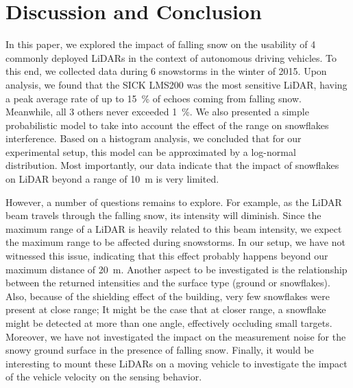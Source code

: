 \section{Discussion and Conclusion}
\label{sec:chap_lidar_conclu}

In this paper, we explored the impact of falling snow on the usability of 4 commonly deployed LiDARs in the context of autonomous driving vehicles. To this end, we collected data during 6 snowstorms in the winter of 2015. Upon analysis, we found that the SICK LMS200 was the most sensitive LiDAR, having a peak average rate of up to 15~\% of echoes coming from falling snow. Meanwhile, all 3 others never exceeded 1~\%. We also presented a simple probabilistic model to take into account the effect of the range on snowflakes interference. Based on a histogram analysis, we concluded that for our experimental setup, this model can be approximated by a log-normal distribution. Most importantly, our data indicate that the impact of snowflakes on LiDAR beyond a range of \SI{10}{\meter} is very limited. 

However, a number of questions remains to explore. For example, as the LiDAR beam travels through the falling snow, its intensity will diminish. Since the maximum range of a LiDAR is heavily related to this beam intensity, we expect the maximum range to be affected during snowstorms. In our setup, we have not witnessed this issue, indicating that this effect probably happens beyond our maximum distance of \SI{20}{\meter}. Another aspect to be investigated is the relationship between the returned intensities and the surface type (ground or snowflakes). Also, because of the shielding effect of the building, very few snowflakes were present at close range; It might be the case that at closer range, a snowflake might be detected at more than one angle, effectively occluding small targets. Moreover, we have not investigated the impact on the measurement noise for the snowy ground surface in the presence of falling snow. Finally, it would be interesting to mount these LiDARs on a moving vehicle to investigate the impact of the vehicle velocity on the sensing behavior.
